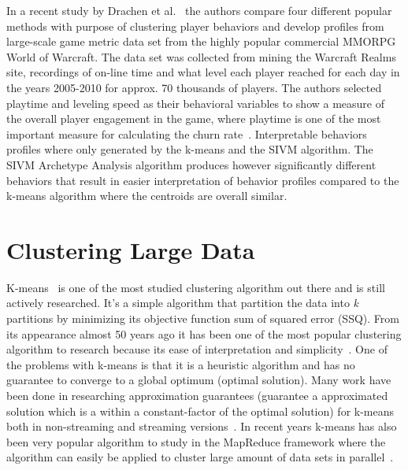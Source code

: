 In a recent study by Drachen et al.~\citep{Drachen:2013} the authors compare four different popular methods with purpose of clustering player behaviors and develop profiles from large-scale game metric data set from the highly popular commercial MMORPG World of Warcraft. The data set was collected from mining the Warcraft Realms site, recordings of on-line time and what level each player reached for each day in the years 2005-2010 for approx. 70 thousands of players. The authors selected playtime and leveling speed as their behavioral variables to show a measure of the overall player engagement in the game, where playtime is one of the most important measure for calculating the churn rate~\citep{Fields:2011SocialGame, Seif:2013GameAnalytics}. Interpretable behaviors profiles where only generated by the k-means and the SIVM algorithm. The SIVM Archetype Analysis algorithm produces however significantly different behaviors that result in easier interpretation of behavior profiles compared to the k-means algorithm where the centroids are overall similar.	

\section{Clustering Large Data}
K-means~\citep{FORGYE.W.:1965, MacQueen:1967KMeans, Lloyd:1982} is one of the most studied clustering algorithm out there and is still actively researched. It's a simple algorithm that partition the data into \textit{k} partitions by minimizing its objective function sum of squared error (SSQ). From its appearance almost 50 years ago it has been one of the most popular clustering algorithm to research because its ease of interpretation and simplicity~\citep{Xu:2005Clustering, Jain:2008KMSurvey, Rokach:2010Survey}. One of the problems with k-means is that it is a heuristic algorithm and has no guarantee to converge to a global optimum (optimal solution). Many work have been done in researching approximation guarantees (guarantee a approximated solution which is a within a constant-factor of the optimal solution) for k-means both in non-streaming and streaming versions~\citep{Kanungo:2002KM, Arthur:2007, Ailon:2009, Braverman:2011, Shindler:2011}. In recent years k-means has also been very popular algorithm to study in the MapReduce framework where the algorithm can easily be applied to cluster large amount of data sets in parallel~\citep{Dean:2004, Zhao:2009, Ngazimbi:2009MSc, Christopoulos:2011Thesis, Ramamoorthy:2011MSc}.

